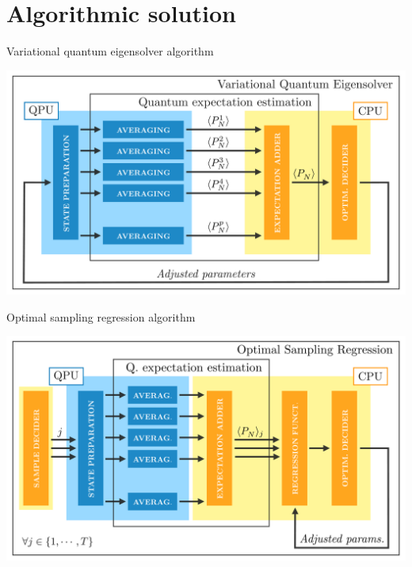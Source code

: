 \documentclass[9pt, handout, aspectratio=169]{beamer}	%
\begin{document}
\section{Algorithmic solution}

\begin{frame}{Variational quantum eigensolver algorithm}

	\begin{center}
		\includegraphics[width=.7\paperwidth]{Figures/NJL1-model-solving/VQE}
	\end{center}

\end{frame}


\begin{frame}{Optimal sampling regression algorithm}

	\begin{center}
		\includegraphics[width=.7\paperwidth]{Figures/NJL1-model-solving/OSR}
	\end{center}

\end{frame}
\end{document}
